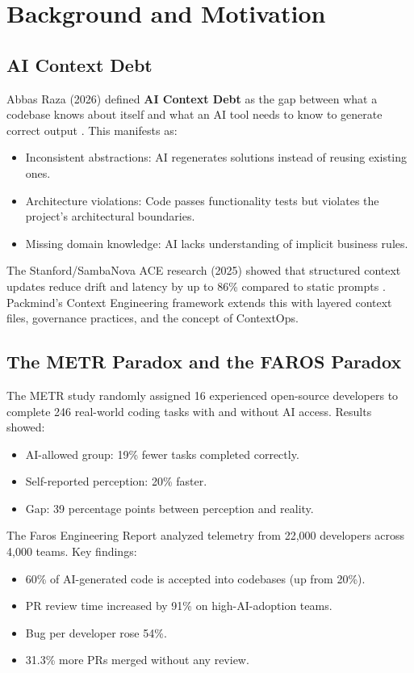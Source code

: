 \documentclass[11pt,a4paper]{article}
\begin{document}
\section{Background and Motivation}

\subsection{AI Context Debt}

Abbas Raza (2026) defined \textbf{AI Context Debt} as the gap between what a codebase knows about itself and what an AI tool needs to know to generate correct output \cite{raza2026}. This manifests as:

\begin{itemize}
    \item Inconsistent abstractions: AI regenerates solutions instead of reusing existing ones.
    \item Architecture violations: Code passes functionality tests but violates the project's architectural boundaries.
    \item Missing domain knowledge: AI lacks understanding of implicit business rules.
\end{itemize}

The Stanford/SambaNova ACE research (2025) showed that structured context updates reduce drift and latency by up to 86\% compared to static prompts \cite{ace2025}. Packmind's Context Engineering framework \cite{packmind2026} extends this with layered context files, governance practices, and the concept of ContextOps.

\subsection{The METR Paradox and the FAROS Paradox}

The METR study \cite{metr2026} randomly assigned 16 experienced open-source developers to complete 246 real-world coding tasks with and without AI access. Results showed:
\begin{itemize}
    \item AI-allowed group: 19\% fewer tasks completed correctly.
    \item Self-reported perception: 20\% faster.
    \item Gap: 39 percentage points between perception and reality.
\end{itemize}

The Faros Engineering Report \cite{faros2026} analyzed telemetry from 22,000 developers across 4,000 teams. Key findings:
\begin{itemize}
    \item 60\% of AI-generated code is accepted into codebases (up from 20\%).
    \item PR review time increased by 91\% on high-AI-adoption teams.
    \item Bug per developer rose 54\%.
    \item 31.3\% more PRs merged without any review.
\end{itemize}
\end{document}
